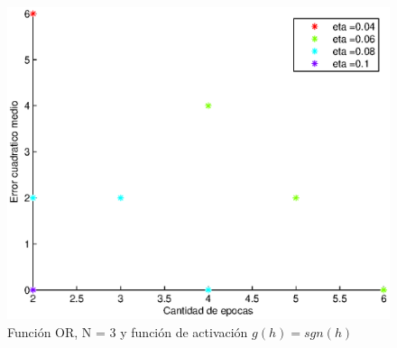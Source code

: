 \documentclass{sig-alternate}
\begin{document}
\begin{figure}[!ht]
	\includegraphics[scale=0.5]{images/PuriOr/OR_N3_err001_step.eps}
  \caption{Funci\'on OR, N = 3 y funci\'on de activaci\'on $g(h) = sgn(h)$}
  \label{fig:step}
\end{figure}
\end{document}
